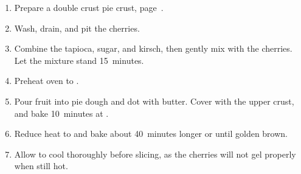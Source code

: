
\begin{ingredients}
\end{ingredients}


\begin{recipe}
  \begin{enumerate}

  \item Prepare a double crust pie crust, page~\pageref{pie-crust}.

  \item Wash, drain, and pit the cherries.

  \item Combine the tapioca, sugar, and kirsch, then gently mix with
    the cherries.  Let the mixture stand 15~minutes.

  \item Preheat oven to .

  \item Pour fruit into pie dough and dot with butter.  Cover with the
    upper crust, and bake 10~minutes at .

  \item Reduce heat to  and bake about 40~minutes longer
    or until golden brown.

  \item Allow to cool thoroughly before slicing, as the cherries will
    not gel properly when still hot.
    
  \end{enumerate}
\end{recipe}
